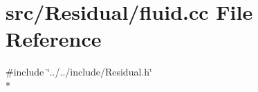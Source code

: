 \section{src/\-Residual/fluid.cc File Reference}
\label{fluid_8cc}
{\ttfamily \#include \char`\"{}../../include/\-Residual.\-h\char`\"{}}\\*
